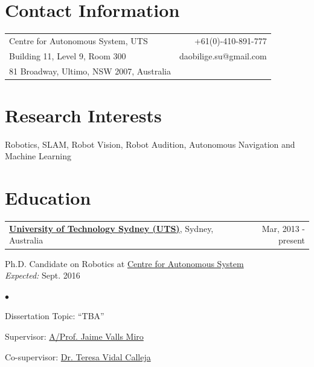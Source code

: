 \documentclass[margin,line]{res}
\newenvironment{list1}{
  \begin{list}{\ding{113}}{%
      \setlength{\itemsep}{0in}
      \setlength{\parsep}{0in} \setlength{\parskip}{0in}
      \setlength{\topsep}{0in} \setlength{\partopsep}{0in} 
      \setlength{\leftmargin}{0.17in}}}{\end{list}}
\newenvironment{list2}{
  \begin{list}{$\bullet$}{%
      \setlength{\itemsep}{0in}
      \setlength{\parsep}{0in} \setlength{\parskip}{0in}
      \setlength{\topsep}{0in} \setlength{\partopsep}{0in} 
      \setlength{\leftmargin}{0.2in}}}{\end{list}}
\begin{document}

\begin{resume}



\section{\sc Contact Information}
\vspace{.05in}
\begin{tabularx}{\textwidth}{X r}
Centre for Autonomous System, UTS      &  +61(0)-410-891-777 \\            
Building 11, Level 9, Room 300         & daobilige.su@gmail.com \\         
81 Broadway, Ultimo, NSW 2007, Australia  & \\%
\end{tabularx}



\section{\sc Research Interests}
Robotics, SLAM, Robot Vision, Robot Audition, Autonomous Navigation and Machine Learning



\section{\sc Education}
\begin{tabularx}{\textwidth}{X r}
\href{http://www.uts.edu.au}{{\bf University of Technology Sydney (UTS)}}, Sydney, Australia  &Mar, 2013 - present\\
\end{tabularx}
\vspace*{-.1in}
\begin{list1}
\item[] Ph.D. Candidate on Robotics at \href{http://www.cas.uts.edu.au}{Centre for Autonomous System}\\ {\it Expected:} Sept. 2016
\begin{list2}
\vspace*{.05in}
\item Dissertation Topic:  ``TBA'' 
\item Supervisor: \href{http://www.uts.edu.au/staff/jaime.vallsmiro}{A/Prof. Jaime Valls Miro}
\item Co-supervisor:  \href{http://www.uts.edu.au/staff/teresa.vidalcalleja}{Dr. Teresa Vidal Calleja}
\end{list2}
\end{list1}


\end{resume}
\end{document}
